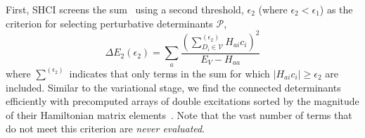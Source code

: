 \documentclass[%
preprint,
 superscriptaddress,
 amsmath,amssymb,
 aps,
]{revtex4-1}
\def\V{\mathcal{V}}
\def\P{\mathcal{P}}
\begin{document}
First, SHCI screens the sum~\cite{HolTubUmr-JCTC-16} using a second threshold, $\epsilon_2$ (where $\epsilon_2<\epsilon_1$) as the criterion for selecting perturbative determinants $\P$,
\begin{equation}
\Delta E_{2} \left(\epsilon_{2}\right) = \sum_a \frac{\left(\sum_{D_{i} \in \V}^{(\epsilon_{2})}  H_{a i} c_{i}\right) ^{2}}{E_{V} - H_{a a}}
\label{eq:PTb}
\end{equation}
where $\sum^{(\epsilon_{2})}$ indicates that only terms in the sum for which $\left|H_{a i} c_{i}\right| \ge \epsilon_{2}$ are included.
Similar to the variational stage, we find the connected determinants efficiently with precomputed arrays of
double excitations sorted by the magnitude of their Hamiltonian matrix elements~\cite{HolTubUmr-JCTC-16}.
Note that the vast number of terms that do not meet this criterion are \emph{never evaluated}.
\end{document}
